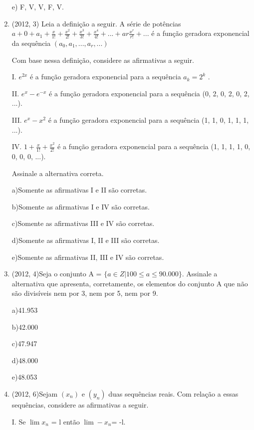 \documentclass{article}
\begin{document}
\begin{enumerate}
e) F, V, V, F, V.\newline



\item(2012, 3) Leia a definição a seguir. A série de potências $a+0 + a_1 + \frac{x}{1!}+ \frac{x^2}{2!}+ \frac{x^3}{3!}+ \frac{x^4}{4!}+... + ar\frac{x^r}{r!}+ ...$ é a função geradora exponencial da sequência $(a_0 , a_1 , ..., a_r , ...)$

Com base nessa definição, considere as afirmativas a seguir.

I. $e^{2x} $ é a função geradora exponencial para a sequência $a_k = 2^k$ .

II. $e^x - e^{-x}$ é a função geradora exponencial para a sequência (0, 2, 0, 2, 0, 2, ...).

III. $e^x - x^2$ é a função geradora exponencial para a sequência (1, 1, 0, 1, 1, 1, ...).

IV. $1+ \frac{x}{1!} + \frac{x^2}{2!}$ é a função geradora exponencial para a sequência (1, 1, 1, 1, 0, 0, 0, 0, ...).

Assinale a alternativa correta.


a)Somente as afirmativas I e II são corretas.

b)Somente as afirmativas I e IV são corretas.

c)Somente as afirmativas III e IV são corretas.

d)Somente as afirmativas I, II e III são corretas.

e)Somente as afirmativas II, III e IV são corretas.\newline



\item(2012, 4)Seja o conjunto A = $\{a \in Z|100 \leq a \leq 90.000\}$. Assinale a alternativa que apresenta, corretamente, os elementos do conjunto A que não são divisíveis nem por 3, nem por 5, nem por 9.

a)41.953

b)42.000

c)47.947

d)48.000

e)48.053\newline



\item(2012, 6)Sejam $(x_n)$ e $(y_n)$ duas sequências reais. Com relação a essas sequências, considere as afirmativas a seguir.

I. Se $\lim x_n$ = l então $\lim -x_n $= -l.


\end{enumerate}
\end{document}
